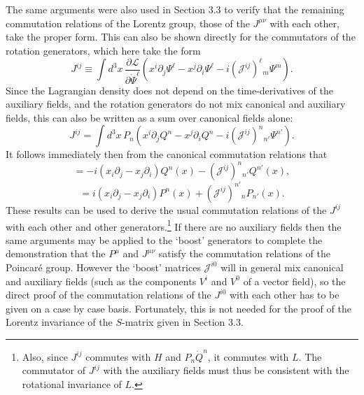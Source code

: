 The same arguments were also used in Section 3.3 to verify that the remaining
commutation relations of the Lorentz group, those of the $J^{\mu\nu}$ with each
other, take the proper form. This can also be shown directly for the
commutators of the rotation generators, which here take the form
\begin{equation}
J^{ij}\equiv\int d^3x\,
\frac{\partial\mathcal{L}}{\partial\dot\Psi^\ell}
\left(x^i\partial_j\Psi^\ell-x^j\partial_i\Psi^\ell
-i(\mathcal{J}^{ij})^\ell{}_m\Psi^m\right).
\tag{7.4.23}\label{eq:7.4.23}
\end{equation}
Since the Lagrangian density does not depend on the time-derivatives of the
auxiliary fields, and the rotation generators do not mix canonical and
auxiliary fields, this can also be written as a sum over canonical fields alone:
\begin{equation}
J^{ij}=\int d^3x\,P_n\left(
x^i\partial_jQ^n-x^j\partial_iQ^n
-i(\mathcal{J}^{ij})^n{}_{n'}\Psi^{n'}\right).
\tag{7.4.24}\label{eq:7.4.24}
\end{equation}
It follows immediately then from the canonical commutation relations that
\begin{equation}
[J^{ij},Q^n(x)]=-i(x_i\partial_j-x_j\partial_i)Q^n(x)
-(\mathcal{J}^{ij})^n{}_{n'}Q^{n'}(x),
\tag{7.4.25}\label{eq:7.4.25}
\end{equation}
\begin{equation}
[J^{ij},P_n(x)]=i(x_i\partial_j-x_j\partial_i)P^n(x)
+(\mathcal{J}^{ij})^{n'}{}_nP_{n'}(x).
\tag{7.4.26}\label{eq:7.4.26}
\end{equation}
These results can be used to derive the usual commutation relations of the
$J^{ij}$ with each other and other generators.\footnote{Also, since $J^{ij}$
commutes with $H$ and $P_n\dot Q^n$, it commutes with $L$. The commutator of
$J^{ij}$ with the auxiliary fields must thus be consistent with the rotational
invariance of $L$.} If there are no auxiliary fields then the same arguments
may be applied to the `boost' generators to complete the demonstration that the
$P^\mu$ and $J^{\mu\nu}$ satisfy the commutation relations of the Poincar\'e
group. However the `boost' matrices $\mathcal{J}^{i0}$ will in general
mix canonical and auxiliary fields (such as the components $V^i$ and $V^0$ of a
vector field), so the direct proof of the commutation relations of the
$J^{i0}$ with each other has to be given on a case by case basis. Fortunately,
this is not needed for the proof of the Lorentz invariance of the $S$-matrix
given in Section 3.3.
